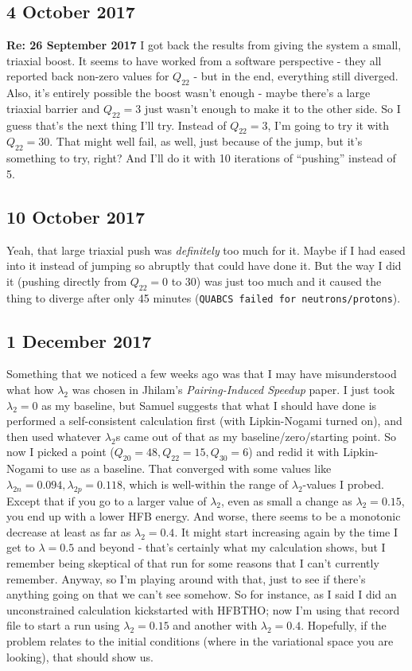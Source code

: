\documentclass[]{report}
\begin{document}
\subsection*{4 October 2017}
\textbf{Re: 26 September 2017} I got back the results from giving the system a small, triaxial boost. It seems to have worked from a software perspective - they all reported back non-zero values for $Q_{22}$ - but in the end, everything still diverged. Also, it's entirely possible the boost wasn't enough - maybe there's a large triaxial barrier and $Q_{22}=3$ just wasn't enough to make it to the other side. So I guess that's the next thing I'll try. Instead of $Q_{22}=3$, I'm going to try it with $Q_{22}=30$. That might well fail, as well, just because of the jump, but it's something to try, right? And I'll do it with 10 iterations of ``pushing'' instead of 5.

\subsection*{10 October 2017}
Yeah, that large triaxial push was \textit{definitely} too much for it. Maybe if I had eased into it instead of jumping so abruptly that could have done it. But the way I did it (pushing directly from $Q_{22}=0$ to $30$) was just too much and it caused the thing to diverge after only 45 minutes (\texttt{QUABCS failed for neutrons/protons}).

\subsection*{1 December 2017}
Something that we noticed a few weeks ago was that I may have misunderstood what how $\lambda_2$ was chosen in Jhilam's \textit{Pairing-Induced Speedup} paper. I just took $\lambda_2=0$ as my baseline, but Samuel suggests that what I should have done is performed a self-consistent calculation first (with Lipkin-Nogami turned on), and then used whatever $\lambda_2$s came out of that as my baseline/zero/starting point. So now I picked a point ($Q_{20}=48, Q_{22}=15, Q_{30}=6$) and redid it with Lipkin-Nogami to use as a baseline. That converged with some values like $\lambda_{2n}=0.094, \lambda_{2p}=0.118$, which is well-within the range of $\lambda_2$-values I probed. Except that if you go to a larger value of $\lambda_2$, even as small a change as $\lambda_2=0.15$, you end up with a lower HFB energy. And worse, there seems to be a monotonic decrease at least as far as $\lambda_2=0.4$. It might start increasing again by the time I get to $\lambda=0.5$ and beyond - that's certainly what my calculation shows, but I remember being skeptical of that run for some reasons that I can't currently remember. Anyway, so I'm playing around with that, just to see if there's anything going on that we can't see somehow. So for instance, as I said I did an unconstrained calculation kickstarted with HFBTHO; now I'm using that record file to start a run using  $\lambda_2=0.15$ and another with $\lambda_2=0.4$. Hopefully, if the problem relates to the initial conditions (where in the variational space you are looking), that should show us.
\end{document}

